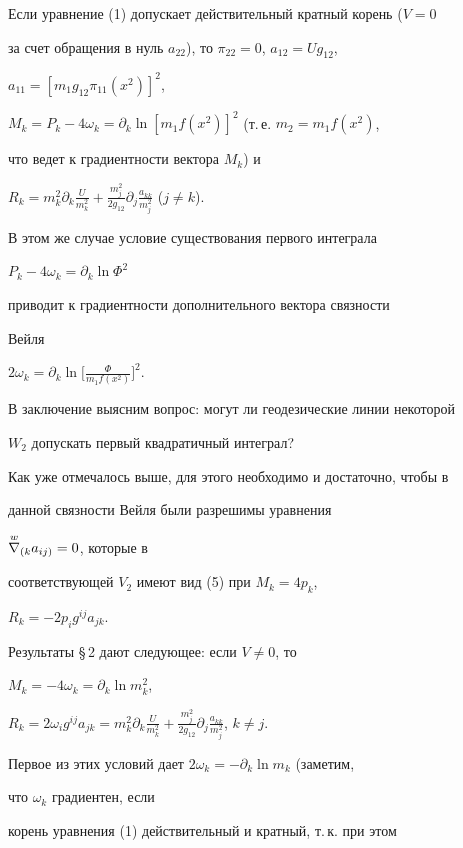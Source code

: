  


Если уравнение (1) допускает действительный кратный корень ($V=0$ 


за счет обращения в нуль $a_{22}$), то $\pi_{22}=0$, $a_{12}=U g_{12}$, 


$a_{11}=[m_1g_{12}\pi_{11}(x^2)]^2$, 


$M_k=P_k-4\omega_k=\partial_k\ln[m_1f(x^2)]^2$ (т.\,е. $m_2=m_1f(x^2)$, 


что ведет к градиентности вектора $M_k$) и 


$R_k=m^2_k\partial_k\frac{U}{m^2_k}+\frac{m^2_j}{2g_{12}} 


\partial_j\frac{a_{kk}}{m^2_j}$ ($j\ne k$). 


В этом же случае условие существования первого интеграла 


$P_k-4\omega_k=\partial_k\ln\Phi^2$ 


приводит к градиентности дополнительного вектора связности 


Вейля 


$2\omega_k=\partial_k\ln\big[\frac{\Phi}{m_1f(x^2)}\big]^2$. 


 


В заключение выясним вопрос: могут ли геодезические линии некоторой


$W_2$ допускать первый квадратичный интеграл? 


 


Как уже отмечалось выше, для этого необходимо и достаточно, чтобы в 


данной связности Вейля были разрешимы уравнения 


$\overset{w}{\nabla}{}_{(k}a_{ij)}=0$, которые в  


соответствующей $V_2$ имеют вид (5) при $M_k=4p_k$, 


$R_k=-2p_i g^{ij}a_{jk}$. 


Результаты \S\,2 дают следующее: если $V\ne 0$, то 


$M_k=-4\omega_k=\partial_k\ln m^2_k$, 


$R_k=2\omega_i g^{ij}a_{jk}=m^2_k\partial_k\frac{U}{m^2_k}+ 


\frac{m^2_j}{2g_{12}}\partial_j\frac{a_{kk}}{m^2_j}$, $k\ne j$. 


Первое из этих условий дает $2\omega_k=-\partial_k\ln m_k$ (заметим, 


что $\omega_k$ градиентен, если 


корень уравнения (1) действительный и кратный, т.\,к. при этом 



